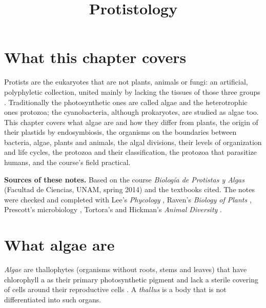 



\title{Protistology}
\maketitle

\label{section-phantom}

\tableofcontents

\section{What this chapter covers}
\label{section-overview}

Protists are the eukaryotes that are not
plants, animals or fungi: an artificial,
polyphyletic collection, united mainly by
lacking the tissues of those three groups
\cite[Chapter 25]{willey2008prescott}.
Traditionally the photosynthetic ones are
called algae and the heterotrophic ones
protozoa; the cyanobacteria, although
prokaryotes, are studied as algae too. This
chapter covers what algae are and how they
differ from plants, the origin of their
plastids by endosymbiosis, the organisms on
the boundaries between bacteria, algae,
plants and animals, the algal divisions,
their levels of organization and life cycles,
the protozoa and their classification, the
protozoa that parasitize humans, and the
course's field practical.

\textbf{Sources of these notes.} Based on
the course \emph{Biolog\'ia de Protistas y
Algas} (Facultad de Ciencias, UNAM,
spring 2014) and the textbooks cited.
The notes were checked and completed with
Lee's \emph{Phycology}
\cite{lee2008phycology}, Raven's
\emph{Biology of Plants}
\cite{evert2013raven}, Prescott's
microbiology \cite{willey2008prescott},
Tortora's \cite{tortora2013microbiology} and
Hickman's \emph{Animal Diversity}
\cite{hickman2002animal}.

\section{What algae are}
\label{section-algae-plants}

\begin{definition}
\label{definition-alga}
\emph{Algae} are thallophytes (organisms
without roots, stems and leaves) that have
chlorophyll a as their primary photosynthetic
pigment and lack a sterile covering of cells
around their reproductive cells \cite[Chapter
1]{lee2008phycology}. A \emph{thallus} is a
body that is not differentiated into such
organs.
\end{definition}

